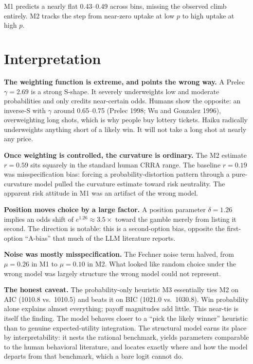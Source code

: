 \documentclass[11pt]{article}
\begin{document}
M1 predicts a nearly flat 0.43--0.49 across bins, missing the observed climb entirely. M2 tracks the
step from near-zero uptake at low $p$ to high uptake at high $p$.

\section{Interpretation}

\textbf{The weighting function is extreme, and points the wrong way.} A Prelec $\gamma = 2.69$ is a
strong S-shape. It severely underweights low and moderate probabilities and only credits near-certain
odds. Humans show the opposite: an inverse-S with $\gamma$ around 0.65--0.75 (Prelec 1998; Wu and
Gonzalez 1996), overweighting long shots, which is why people buy lottery tickets. Haiku radically
underweights anything short of a likely win. It will not take a long shot at nearly any price.

\textbf{Once weighting is controlled, the curvature is ordinary.} The M2 estimate $r = 0.59$ sits
squarely in the standard human CRRA range. The baseline $r = 0.19$ was misspecification bias: forcing
a probability-distortion pattern through a pure-curvature model pulled the curvature estimate toward
risk neutrality. The apparent risk attitude in M1 was an artifact of the wrong model.

\textbf{Position moves choice by a large factor.} A position parameter $\delta = 1.26$ implies an odds
shift of $e^{1.26} \approx 3.5\times$ toward the gamble merely from listing it second. The direction is
notable: this is a second-option bias, opposite the first-option ``A-bias'' that much of the LLM
literature reports.

\textbf{Noise was mostly misspecification.} The Fechner noise term halved, from $\mu = 0.26$ in M1 to
$\mu = 0.10$ in M2. What looked like random choice under the wrong model was largely structure the
wrong model could not represent.

\textbf{The honest caveat.} The probability-only heuristic M3 essentially ties M2 on AIC (1010.8 vs.\
1010.5) and beats it on BIC (1021.0 vs.\ 1030.8). Win probability alone explains almost everything;
payoff magnitudes add little. This near-tie is itself the finding. The model behaves closer to a
``pick the likely winner'' heuristic than to genuine expected-utility integration. The structural
model earns its place by interpretability: it nests the rational benchmark, yields parameters
comparable to the human behavioral literature, and locates exactly where and how the model departs
from that benchmark, which a bare logit cannot do.
\end{document}
